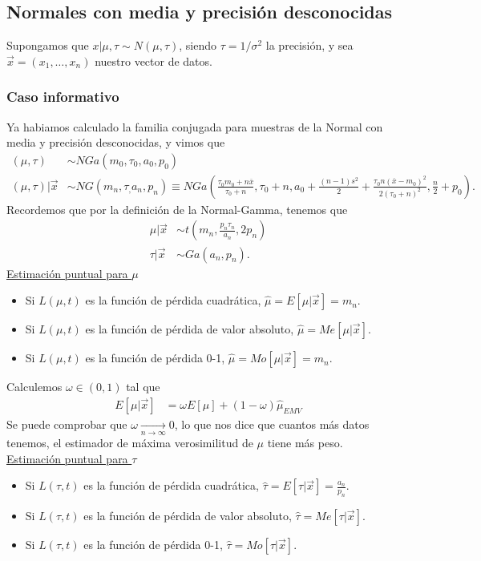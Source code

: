 \subsection{Normales con media y precisión desconocidas}
\noindent Supongamos que $x | \mu, \tau \sim N(\mu,\tau)$, siendo $\tau = 1/\sigma^2$ la precisión, y sea $\vec{x} = (x_1, \ldots, x_n)$ nuestro vector de datos.
\subsubsection{Caso informativo}
\noindent Ya habiamos calculado la familia conjugada para muestras de la Normal con media y precisión desconocidas, y vimos que
\begin{align*}
    (\mu,\tau) &\sim NGa(m_0,\tau_0,a_0,p_0) \\
    (\mu,\tau) | \vec{x} &\sim NG(m_n,\tau_,a_n,p_n) \equiv NGa\left( \frac{\tau_0m_0 + n\overline{x}}{\tau_0 + n}, \tau_0+n, a_0 + \frac{(n-1)s^2}{2} + \frac{\tau_0n(\overline{x}-m_0)^2}{2(\tau_0+n)^2}, \frac{n}{2} + p_0 \right).
\end{align*}
Recordemos que por la definición de la Normal-Gamma, tenemos que
\begin{align*}
    \mu | \vec{x} &\sim t\left(m_n, \frac{p_n\tau_n}{a_n}, 2p_n \right) \\
    \tau | \vec{x} &\sim Ga(a_n,p_n).
\end{align*}
\noindent \underline{Estimación puntual para $\mu$}
\begin{itemize}
    \item Si $L(\mu,t)$ es la función de pérdida cuadrática, $\widehat{\mu} = E[\mu |  \vec{x}] = m_n$.
    \item Si $L(\mu,t)$ es la función de pérdida de valor absoluto, $\widehat{\mu} = Me[\mu |  \vec{x}]$.
    \item Si $L(\mu,t)$ es la función de pérdida 0-1, $ \widehat{\mu} = Mo[\mu |  \vec{x}] = m_n$.
\end{itemize}
Calculemos $\omega \in (0,1)$ tal que 
\begin{align*}
    E[\mu  | \vec{x}] &= \omega E[\mu]  + (1 - \omega) \widehat{\mu }_{EMV} 
\end{align*}
Se puede comprobar que $\omega \xrightarrow[n \to \infty]{} 0$, lo que nos dice que cuantos más datos tenemos, el estimador de máxima verosimilitud de $\mu$ tiene más peso.
\\
\newline
\noindent \underline{Estimación puntual para $\tau$}
\begin{itemize}
    \item Si $L(\tau,t)$ es la función de pérdida cuadrática, $\widehat{\tau} = E[\tau |  \vec{x}] = \frac{a_n}{p_n}$.
    \item Si $L(\tau,t)$ es la función de pérdida de valor absoluto, $\widehat{\tau} = Me[\tau |  \vec{x}]$.
    \item Si $L(\tau,t)$ es la función de pérdida 0-1, $ \widehat{\tau} = Mo[\tau |  \vec{x}]$.
\end{itemize}
